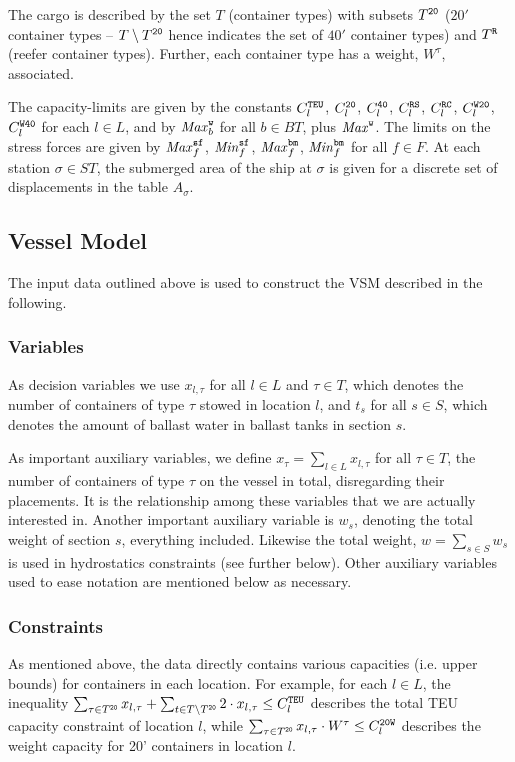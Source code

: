 The cargo is described by the set $T$ (container types) with subsets $T^{\texttt{20}}$ ($20'$ container types -- $T\setminus T^{\texttt{20}}$ hence indicates the set of $40'$ container types) and $T^{\texttt{R}}$ (reefer container types). 
Further, each container type has a weight, $W^\tau$, associated.

The capacity-limits are given by the constants $C^{\texttt{TEU}}_l$, $C^{\texttt{20}}_l$, $C^{\texttt{40}}_l$, $C^{\texttt{RS}}_l$, $C^{\texttt{RC}}_l$, $C^{\texttt{W20}}_l$, $C^{\texttt{W40}}_l$ for each $l\in L$, and by $\mathit{Max}^{\texttt{w}}_b$ for all $b\in BT$, plus $\mathit{Max}^{\texttt{w}}$. The limits on the stress forces are given by $\mathit{Max}^{\texttt{sf}}_f$, $\mathit{Min}^{\texttt{sf}}_f$, $\mathit{Max}^{\texttt{bm}}_f$, $\mathit{Min}^{\texttt{bm}}_f$ for all $f\in F$. At each station $\sigma\in ST$, the submerged area of the ship at $\sigma$ is given for a discrete set of displacements in the table $A_\sigma$.

\subsection{Vessel Model}
The input data outlined above is used to construct the VSM described in the following.

\subsubsection{Variables}
As decision variables we use $x_{l,\tau}$ for all $l\in L$ and $\tau \in T$, which denotes the number of containers of type $\tau$ stowed in location $l$, and $t_s$ for all $s\in S$, which denotes the amount of ballast water in ballast tanks in section $s$. 

As important auxiliary variables, we define $x_\tau = \sum_{l\in L} x_{l,\tau}$ for all $\tau\in T$, the number of containers of type $\tau$ on the vessel in total, disregarding their placements. It is the relationship among these variables that we are actually interested in.  
Another important auxiliary variable is $w_s$, denoting the total weight of section $s$, everything included. Likewise the total weight, $w = \sum_{s\in S}w_s$ is used in hydrostatics constraints (see further below). 
Other auxiliary variables used to ease notation are mentioned below as necessary.

\subsubsection{Constraints}
As mentioned above, the data directly contains various capacities (i.e. upper bounds) for containers in each location. For example, for each $l\in L$, the inequality $\sum_{\tau \in T^{\texttt{20}}}x_{l,\tau} + \sum_{t\in T\setminus T^{\texttt{20}}}2\cdot x_{l,\tau}\leq C^{\texttt{TEU}}_l$  describes the total TEU capacity constraint of location $l$, while $\sum_{\tau \in T^{\texttt{20}}}x_{l,\tau}\cdot W^\tau\leq C^{\texttt{20W}}_l$ describes the weight capacity for 20' containers in location $l$.

